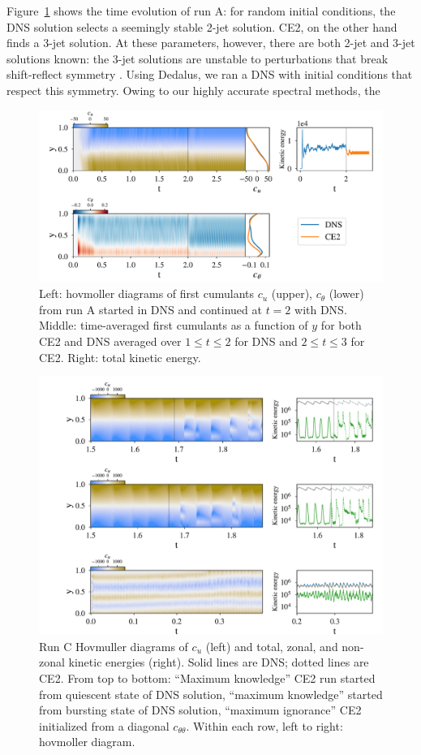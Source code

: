 \documentclass{jfm}
\newcommand{\cu}{c_u}
\newcommand{\ctt}{c_{\theta \theta}}
\begin{document}
Figure~\ref{fig:run_A} shows the time evolution of run A: for random initial conditions, the DNS solution selects a seemingly stable 2-jet solution.
CE2, on the other hand finds a 3-jet solution.
At these parameters, however, there are both 2-jet and 3-jet solutions known: the 3-jet solutions are unstable to perturbations that break shift-reflect symmetry \citep{bh1993}. Using Dedalus, we ran a DNS with initial conditions that respect this symmetry. Owing to our highly accurate spectral methods, the 
\begin{figure}
  \centering
  \includegraphics[width=\textwidth]{../../figs/run_A_fig.pdf}
  \caption{Left: hovmoller diagrams of first cumulants $\cu$ (upper), $c_\theta$ (lower) from run A started in DNS and continued at $t=2$ with DNS. Middle: time-averaged first cumulants as a function of $y$ for both CE2 and DNS averaged over $1 \le t \le 2$ for DNS and $2 \le t \le 3$ for CE2. Right: total kinetic energy.}
  \label{fig:run_A}
\end{figure}

\begin{figure}
  \centering
  \includegraphics[width=\textwidth]{../../figs/run_C_fig.pdf}
  \caption{Run C Hovmuller diagrams of $\cu$ (left) and total, zonal, and non-zonal kinetic energies (right). Solid lines are DNS; dotted lines are CE2. From top to bottom: ``Maximum knowledge'' CE2 run started from quiescent state of DNS solution, ``maximum knowledge'' started from bursting state of DNS solution, ``maximum ignorance'' CE2 initialized from a diagonal $\ctt$. Within each row, left to right: hovmoller diagram. }
  \label{fig:run_C}
\end{figure}
\end{document}
